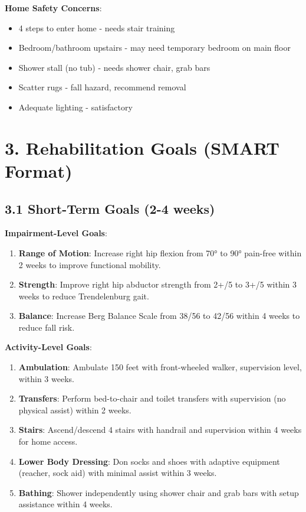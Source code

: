 \documentclass[11pt,letterpaper]{article}
\begin{document}
\textbf{Home Safety Concerns}:
\begin{itemize}[leftmargin=*]
    \item 4 steps to enter home - needs stair training
    \item Bedroom/bathroom upstairs - may need temporary bedroom on main floor
    \item Shower stall (no tub) - needs shower chair, grab bars
    \item Scatter rugs - fall hazard, recommend removal
    \item Adequate lighting - satisfactory
\end{itemize}

\section*{3. Rehabilitation Goals (SMART Format)}

\subsection*{3.1 Short-Term Goals (2-4 weeks)}

\textbf{Impairment-Level Goals}:
\begin{enumerate}[leftmargin=*]
    \item \textbf{Range of Motion}: Increase right hip flexion from 70° to 90° pain-free within 2 weeks to improve functional mobility.
    
    \item \textbf{Strength}: Improve right hip abductor strength from 2+/5 to 3+/5 within 3 weeks to reduce Trendelenburg gait.
    
    \item \textbf{Balance}: Increase Berg Balance Scale from 38/56 to 42/56 within 4 weeks to reduce fall risk.
\end{enumerate}

\textbf{Activity-Level Goals}:
\begin{enumerate}[leftmargin=*]
    \item \textbf{Ambulation}: Ambulate 150 feet with front-wheeled walker, supervision level, within 3 weeks.
    
    \item \textbf{Transfers}: Perform bed-to-chair and toilet transfers with supervision (no physical assist) within 2 weeks.
    
    \item \textbf{Stairs}: Ascend/descend 4 stairs with handrail and supervision within 4 weeks for home access.
    
    \item \textbf{Lower Body Dressing}: Don socks and shoes with adaptive equipment (reacher, sock aid) with minimal assist within 3 weeks.
    
    \item \textbf{Bathing}: Shower independently using shower chair and grab bars with setup assistance within 4 weeks.
\end{enumerate}
\end{document}

